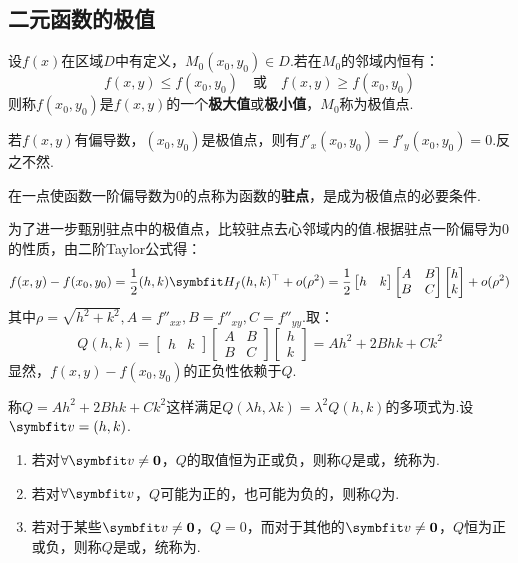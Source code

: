 \subsection{二元函数的极值}
\begin{definition}
    设$f(x)$在区域$D$中有定义，$M_0(x_0,y_0) \in D$.若在$M_0$的邻域内恒有：
    \[f(x,y) \leqslant f(x_0,y_0) \quad\text{或}\quad f(x,y) \geqslant f(x_0,y_0)\]
    则称$f(x_0,y_0)$是$f(x,y)$的一个\textbf{极大值}或\textbf{极小值}，$M_0$称为极值点.
\end{definition}

\begin{theorem}
    若$f(x,y)$有偏导数，$(x_0,y_0)$是极值点，则有$f'_x(x_0,y_0) = f'_y(x_0,y_0) = 0$.反之不然.
\end{theorem}

\begin{definition}
    在一点使函数一阶偏导数为$0$的点称为函数的\textbf{驻点}，是成为极值点的必要条件.
\end{definition}

为了进一步甄别驻点中的极值点，比较驻点去心邻域内的值.根据驻点一阶偏导为$0$的性质，由二阶Taylor公式得：
\[f(x,y) - f(x_0,y_0) = \frac{1}{2}(h,k)\vb{H}_f (h,k)^\top + o(\rho^2) = \frac{1}{2}\begin{bmatrix}
    h & k
\end{bmatrix}\begin{bmatrix}
    A & B \\ B & C
\end{bmatrix}\begin{bmatrix}
    h \\ k
\end{bmatrix} + o(\rho^2)\]
其中$\rho = \sqrt{h^2+k^2},A = f''_{xx},B = f''_{xy},C = f''_{yy}$.取：
\[Q(h,k) = \begin{bmatrix}
    h & k
\end{bmatrix}\begin{bmatrix}
    A & B \\ B & C
\end{bmatrix}\begin{bmatrix}
    h \\ k
\end{bmatrix} = Ah^2 + 2Bhk + Ck^2\]
显然，$f(x,y)-f(x_0,y_0)$的正负性依赖于$Q$.
\begin{definition}
    称$Q = Ah^2 + 2Bhk + Ck^2$这样满足$Q(\lambda h,\lambda k) = \lambda^2Q(h,k)$的多项式为.设$\vb{v} = (h,k)$.
    \begin{enumerate}[circ]
        \item 若对$\forall\vb{v}\neq\bm{0}$，$Q$的取值恒为正或负，则称$Q$是或，统称为.
        \item 若对$\forall\vb{v}$，$Q$可能为正的，也可能为负的，则称$Q$为.
        \item 若对于某些$\vb{v}\neq\bm{0}$，$Q = 0$，而对于其他的$\vb{v}\neq\bm{0}$，$Q$恒为正或负，则称$Q$是或，统称为.
    \end{enumerate}
\end{definition}

